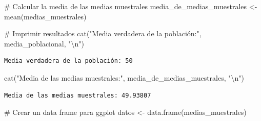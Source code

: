 \documentclass[
  letterpaper,
  DIV=11,
  numbers=noendperiod]{scrreprt}
\newenvironment{Shaded}{\begin{snugshade}}{\end{snugshade}}
\newcommand{\CommentTok}[1]{\textcolor[rgb]{0.37,0.37,0.37}{#1}}
\newcommand{\FunctionTok}[1]{\textcolor[rgb]{0.28,0.35,0.67}{#1}}
\newcommand{\NormalTok}[1]{\textcolor[rgb]{0.00,0.23,0.31}{#1}}
\newcommand{\OtherTok}[1]{\textcolor[rgb]{0.00,0.23,0.31}{#1}}
\newcommand{\SpecialCharTok}[1]{\textcolor[rgb]{0.37,0.37,0.37}{#1}}
\newcommand{\StringTok}[1]{\textcolor[rgb]{0.13,0.47,0.30}{#1}}
\begin{document}
\begin{tcolorbox}
\begin{Shaded}
\begin{Highlighting}[]
\CommentTok{\# Calcular la media de las medias muestrales}
\NormalTok{media\_de\_medias\_muestrales }\OtherTok{\textless{}{-}} \FunctionTok{mean}\NormalTok{(medias\_muestrales)}

\CommentTok{\# Imprimir resultados}
\FunctionTok{cat}\NormalTok{(}\StringTok{"Media verdadera de la población:"}\NormalTok{, media\_poblacional, }\StringTok{"}\SpecialCharTok{\textbackslash{}n}\StringTok{"}\NormalTok{)}
\end{Highlighting}
\end{Shaded}

\begin{verbatim}
Media verdadera de la población: 50 
\end{verbatim}

\begin{Shaded}
\begin{Highlighting}[]
\FunctionTok{cat}\NormalTok{(}\StringTok{"Media de las medias muestrales:"}\NormalTok{, media\_de\_medias\_muestrales, }\StringTok{"}\SpecialCharTok{\textbackslash{}n}\StringTok{"}\NormalTok{)}
\end{Highlighting}
\end{Shaded}

\begin{verbatim}
Media de las medias muestrales: 49.93807 
\end{verbatim}

\begin{Shaded}
\begin{Highlighting}[]
\CommentTok{\# Crear un data frame para ggplot}
\NormalTok{datos }\OtherTok{\textless{}{-}} \FunctionTok{data.frame}\NormalTok{(medias\_muestrales)}


\end{Highlighting}
\end{Shaded}
\end{tcolorbox}
\end{document}
